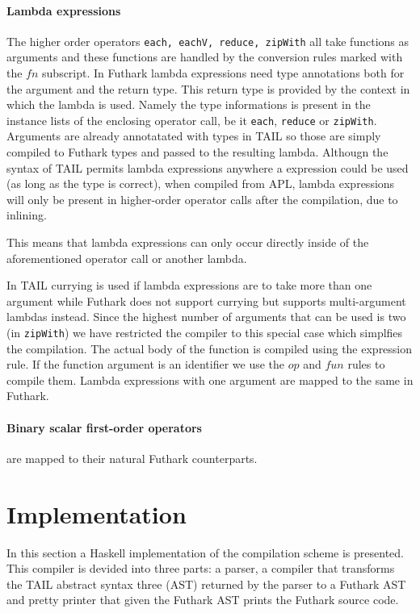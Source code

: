 \documentclass[11pt]{article}
\begin{document}
\paragraph{Lambda expressions} 
The higher order operators {\tt each, eachV, reduce, zipWith} all take functions as arguments and these functions are handled by the
conversion rules marked with the $fn$ subscript. 
In Futhark lambda expressions need type annotations both for the argument and the return type.
This return type is provided by the context in which the lambda is used.
Namely the type informations is present in the instance lists of the enclosing operator call, be it {\tt each}, {\tt reduce} or {\tt zipWith}.
Arguments are already annotatated with types in TAIL so those are simply compiled to Futhark types and passed to the resulting lambda. Althougn the syntax of TAIL permits lambda expressions anywhere a  expression could be used (as long as the type is correct),
when compiled from APL, lambda expressions will only be present in higher-order operator calls after the compilation, due to inlining.

This means that lambda expressions can only occur directly inside of the aforementioned operator call or another lambda.

In TAIL currying is used if lambda expressions are to take more than one argument while Futhark does not support currying but
supports multi-argument lambdas instead.
Since the highest number of arguments that can be used is two (in {\tt zipWith}) we have
restricted the compiler to this special case which simplfies the compilation.
The actual body of the function is compiled using the expression rule.
If the function argument is an identifier we use the $op$ and $fun$ rules to compile them.
Lambda expressions with one argument are mapped to the same in Futhark.


\paragraph{Binary scalar first-order operators} are mapped to their natural Futhark counterparts.

\section{Implementation}
\label{sec:impl}
In this section a Haskell implementation of the compilation scheme is presented. This compiler is devided into three parts: a parser, a compiler that transforms the TAIL abstract syntax three (AST) returned by the parser to a Futhark AST and pretty printer that given the Futhark AST prints the Futhark source code. 
\end{document}

